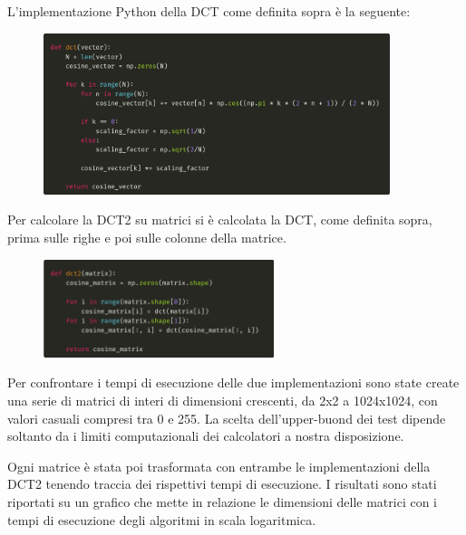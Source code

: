 \documentclass[a4paper, 12pt]{article}
\begin{document}
L'implementazione Python della DCT come definita sopra è la seguente:
\begin{figure}[H]
	\centering
	\includegraphics[width=0.9\textwidth]{imgs/dct-python.png}
\end{figure}

Per calcolare la DCT2 su matrici si è calcolata la DCT, come definita sopra, prima
sulle righe e poi sulle colonne della matrice.
\begin{figure}[H]
	\centering
	\includegraphics[width=0.6\textwidth]{imgs/dct2-python.png}
\end{figure}


Per confrontare i tempi di esecuzione delle due implementazioni sono state
create una serie di matrici di interi di dimensioni crescenti, da 2x2 a
1024x1024, con valori casuali compresi tra 0 e 255. La scelta dell'upper-buond
dei test dipende soltanto da i limiti computazionali dei calcolatori a nostra
disposizione.

Ogni matrice è stata poi trasformata con entrambe le implementazioni della DCT2
tenendo traccia dei rispettivi tempi di esecuzione. I risultati sono stati
riportati su un grafico che mette in relazione le dimensioni delle matrici con i
tempi di esecuzione degli algoritmi in scala logaritmica.
\end{document}
